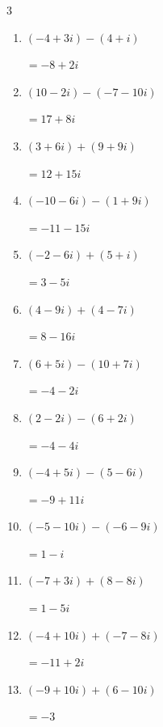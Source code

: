 \begin{multicols}{3}
\begin{enumerate}
        $\displaystyle =-6-13i$

  \item $\displaystyle (-4+3i) - (4+i)$

        $\displaystyle =-8+2i$

  \item $\displaystyle (10-2i) - (-7-10i)$

        $\displaystyle =17+8i$

  \item $\displaystyle (3+6i) + (9+9i)$

        $\displaystyle =12+15i$

\columnbreak %

  \item $\displaystyle (-10-6i) - (1+9i)$

        $\displaystyle =-11-15i$

  \item $\displaystyle (-2-6i) + (5+i)$

        $\displaystyle =3-5i$

  \item $\displaystyle (4-9i) + (4-7i)$

        $\displaystyle =8-16i$

  \item $\displaystyle (6+5i) - (10+7i)$

        $\displaystyle =-4-2i$

  \item $\displaystyle (2-2i) - (6+2i)$

        $\displaystyle =-4-4i$

  \item $\displaystyle (-4+5i) - (5-6i)$

        $\displaystyle =-9+11i$

  \item $\displaystyle (-5-10i) - (-6-9i)$

        $\displaystyle =1-i$

  \item $\displaystyle (-7+3i) + (8-8i)$

        $\displaystyle =1-5i$

  \item $\displaystyle (-4+10i) + (-7-8i)$

        $\displaystyle =-11+2i$

  \item $\displaystyle (-9+10i) + (6-10i)$

        $\displaystyle =-3$


\end{enumerate}
\end{multicols}
